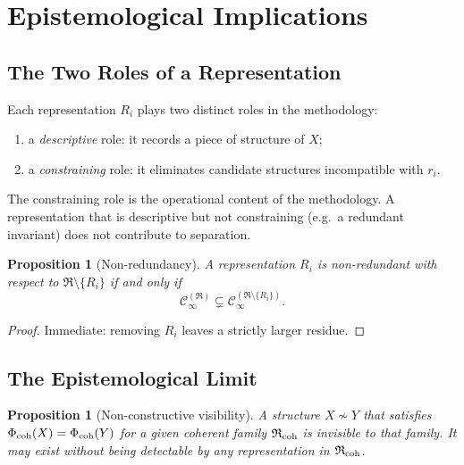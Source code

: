 \documentclass[11pt,a4paper]{article}
\theoremstyle{definition}
\theoremstyle{plain}
\newtheorem{proposition}[definition]{Proposition}
\newcommand{\Ccal}{\mathcal{C}}
\newcommand{\Rfrak}{\mathfrak{R}}
\newcommand{\Phimap}{\Phi}
\newcommand{\simadm}{\sim}
\begin{document}
\section{Epistemological Implications}
\label{sec:epistemology}

\subsection{The Two Roles of a Representation}

Each representation $R_i$ plays two distinct roles in the
methodology:
\begin{enumerate}[label=(\roman*)]
  \item a \emph{descriptive} role: it records a piece of structure
        of $X$;
  \item a \emph{constraining} role: it eliminates candidate
        structures incompatible with $r_i$.
\end{enumerate}

The constraining role is the operational content of the
methodology. A representation that is descriptive but not
constraining (e.g.\ a redundant invariant) does not contribute to
separation.

\begin{proposition}[Non-redundancy]\label{prop:non-redundancy}
A representation $R_i$ is \emph{non-redundant} with respect to
$\Rfrak \setminus \{R_i\}$ if and only if
\[
  \Ccal_\infty^{(\Rfrak)} \subsetneq
  \Ccal_\infty^{(\Rfrak \setminus \{R_i\})}.
\]
\end{proposition}

\begin{proof}
Immediate: removing $R_i$ leaves a strictly larger residue.
\end{proof}

\subsection{The Epistemological Limit}

\begin{proposition}[Non-constructive visibility]\label{prop:visibility}
A structure $X \not\simadm Y$ that satisfies
$\Phimap_{\rm coh}(X) = \Phimap_{\rm coh}(Y)$ for a given coherent
family $\Rfrak_{\rm coh}$ is \emph{invisible} to that family. It may
exist without being detectable by any representation in
$\Rfrak_{\rm coh}$.
\end{proposition}
\end{document}
